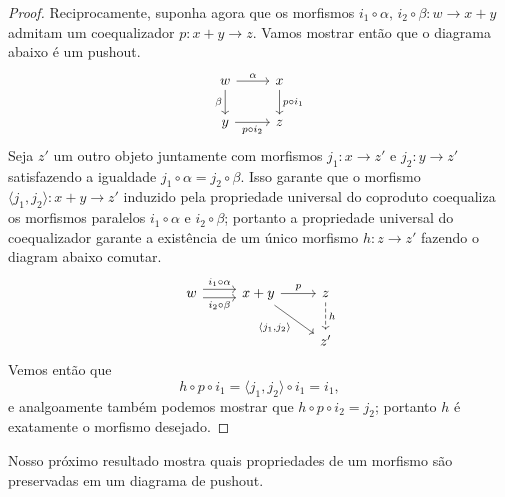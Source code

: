 \begin{proof}
    Reciprocamente, suponha agora que os morfismos $i_1 \circ \alpha,\, i_2 \circ \beta: w \to x+y$ admitam um coequalizador $p: x+y \to z$.
    Vamos mostrar então que o diagrama abaixo é um pushout.
    \begin{displaymath}
        \begin{tikzcd}
            w
            \arrow[r, "\alpha"]
            \arrow[d, "\beta" swap]
            & x
            \arrow[d, "p \circ i_1"]
            \\ y
            \arrow[r, "p \circ i_2" swap]
            & z
        \end{tikzcd}
    \end{displaymath}
    Seja $z'$ um outro objeto juntamente com morfismos $j_1: x \to z'$ e $j_2: y \to z'$ satisfazendo a igualdade $j_1 \circ \alpha = j_2 \circ \beta$.
    Isso garante que o morfismo $\langle j_1,j_2 \rangle: x+y \to z'$ induzido pela propriedade universal do coproduto coequaliza os morfismos paralelos $i_1 \circ \alpha$ e $i_2 \circ \beta$; portanto a propriedade universal do coequalizador garante a existência de um único morfismo $h: z \to z'$ fazendo o diagram abaixo comutar.
    \begin{displaymath}
        \begin{tikzcd}
            w
            \arrow[r, shift left=1.25, "i_1 \circ \alpha"]
            \arrow[r, shift right=1.25, "i_2 \circ \beta" swap]
            & x+y
            \arrow[r, "p"]
            \arrow[rd, "{\langle j_1,j_2 \rangle}" swap]
            & z
            \arrow[d, dashed, "h"]
            \\ & & z'
        \end{tikzcd}
    \end{displaymath}
    Vemos então que
    \begin{displaymath}
        h \circ p \circ i_1
        = \langle j_1,j_2 \rangle \circ i_1
        = i_1,
    \end{displaymath}
    e analgoamente também podemos mostrar que $h \circ p \circ i_2 = j_2$; portanto $h$ é exatamente o morfismo desejado.
\end{proof}

Nosso próximo resultado mostra quais propriedades de um morfismo são preservadas em um diagrama de pushout.

